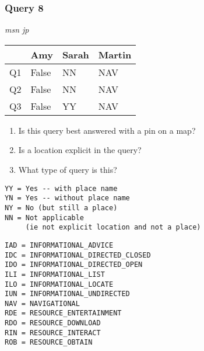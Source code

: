 \begin{frame}[fragile]
\frametitle{Query 8}
\vspace{1em}

\emph{msn jp}

\vfill

\begin{table}
  \centering
  \begin{tabular}{ l l l l }
    & \textbf{Amy} & \textbf{Sarah} & \textbf{Martin}\\
    \toprule
    Q1 & False & NN & NAV\\
Q2 & False & NN & NAV\\
Q3 & False & YY & NAV\\
    \bottomrule
  \end{tabular}
\end{table}

\vfill

\tiny{

\begin{enumerate}
\item Is this query best answered with a pin on a map?
\item Is a location explicit in the query?
\item What type of query is this?
\end{enumerate}

\vfill

\begin{multicols}{2}
\begin{verbatim}
YY = Yes -- with place name
YN = Yes -- without place name
NY = No (but still a place)
NN = Not applicable 
     (ie not explicit location and not a place)
\end{verbatim}

\columnbreak
\begin{verbatim}
IAD = INFORMATIONAL_ADVICE
IDC = INFORMATIONAL_DIRECTED_CLOSED
IDO = INFORMATIONAL_DIRECTED_OPEN
ILI = INFORMATIONAL_LIST
ILO = INFORMATIONAL_LOCATE
IUN = INFORMATIONAL_UNDIRECTED
NAV = NAVIGATIONAL
RDE = RESOURCE_ENTERTAINMENT
RDO = RESOURCE_DOWNLOAD
RIN = RESOURCE_INTERACT
ROB = RESOURCE_OBTAIN
\end{verbatim}
\end{multicols}
}

\end{frame}


